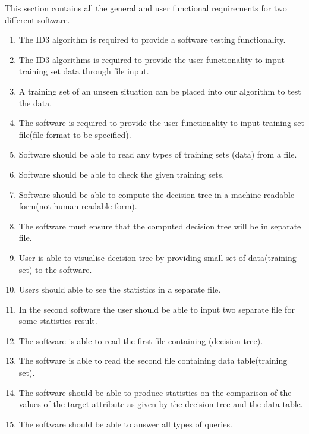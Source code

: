 \documentclass{report}
\begin{document}
This section contains all the general and user functional requirements for two different software.
\begin{enumerate}

\item The ID3 algorithm is required to provide a software testing functionality.

\item The ID3 algorithms is required to provide the user functionality to input training set data through file input.

\item A training set of an unseen situation can be placed into our algorithm to test the data.

\item The software is required to provide the user functionality to input training set file(file format to be specified).

\item Software should be able to read any types of training sets (data) from a file.

\item Software should be able to check the given training sets.

\item Software should be able to compute the decision tree in a machine readable form(not human readable form).

\item The software must ensure that the computed decision tree will be in separate file.

\item User is able to visualise decision tree by providing small set of data(training set) to the software.

\item Users should able to see the statistics in a separate file.

\item In the second software the user should be able to input two separate file for some statistics result.

\item The software is able to read the first file containing (decision tree). 

\item The software is able to read the second file containing data table(training set). 

\item The software should be able to produce statistics on the comparison of the values of the target attribute as given by the decision tree and the data table.

\item The software should be able to answer all types of queries.

\end{enumerate}
\end{document}
